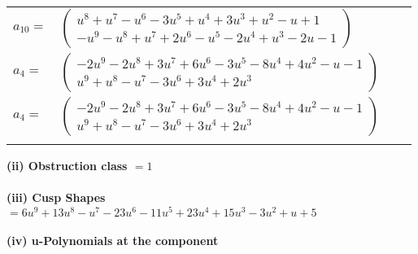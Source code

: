 \documentclass[1p]{elsarticle_modified}
\theoremstyle{definition}
\begin{document}
\begin{tabular}{m{7pt} m{180pt} m{7pt} m{180pt} }
\flushright $a_{10}=$&$\begin{pmatrix}u^8+u^7- u^6-3 u^5+u^4+3 u^3+u^2- u+1\\- u^9- u^8+u^7+2 u^6- u^5-2 u^4+u^3-2 u-1\end{pmatrix}$ \\
\flushright $a_{4}=$&$\begin{pmatrix}-2 u^9-2 u^8+3 u^7+6 u^6-3 u^5-8 u^4+4 u^2- u-1\\u^9+u^8- u^7-3 u^6+3 u^4+2 u^3\end{pmatrix}$\\ \flushright $a_{4}=$&$\begin{pmatrix}-2 u^9-2 u^8+3 u^7+6 u^6-3 u^5-8 u^4+4 u^2- u-1\\u^9+u^8- u^7-3 u^6+3 u^4+2 u^3\end{pmatrix}$\\&\end{tabular}
\flushleft \textbf{(ii) Obstruction class $= 1$}\\~\\
\flushleft \textbf{(iii) Cusp Shapes $= 6 u^9+13 u^8- u^7-23 u^6-11 u^5+23 u^4+15 u^3-3 u^2+u+5$}\\~\\
\newpage\renewcommand{\arraystretch}{1}
\flushleft \textbf{(iv) u-Polynomials at the component}\newline \\
\end{document}

